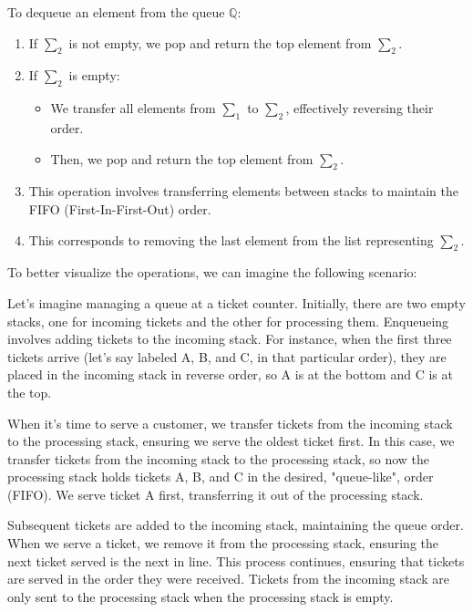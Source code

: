 \documentclass[12pt]{article}
\begin{document}
\begin{spacing}{1.5}
\begin{enumerate}
		      To dequeue an element from the queue $\mathbb{Q}$:
		      		      
		      \begin{enumerate}
		      	\item If $\sum_2$ is not empty, we pop and return the top element from $\sum_2$.
		      	\item If $\sum_2$ is empty:
		      	      \begin{itemize}
		      	      	\item We transfer all elements from $\sum_1$ to $\sum_2$, effectively reversing their order.
		      	      	\item Then, we pop and return the top element from $\sum_2$.
		      	      \end{itemize}
		      	\item This operation involves transferring elements between stacks to maintain the FIFO (First-In-First-Out) order.
		      	\item This corresponds to removing the last element from the list representing $\sum_2$.
		      \end{enumerate}
		      		      
		      To better visualize the operations, we can imagine the following scenario:
		      		      
		      Let's imagine managing a queue at a ticket counter. Initially, there are two empty stacks, one for incoming tickets and the other for processing them. Enqueueing involves adding tickets to the incoming stack. For instance, when the first three tickets arrive (let's say labeled A, B, and C, in that particular order), they are placed in the incoming stack in reverse order, so A is at the bottom and C is at the top.
		      		              
		      When it's time to serve a customer, we transfer tickets from the incoming stack to the processing stack, ensuring we serve the oldest ticket first. In this case, we transfer tickets from the incoming stack to the processing stack, so now the processing stack holds tickets A, B, and C in the desired, "queue-like", order (FIFO). We serve ticket A first, transferring it out of the processing stack.
		      		              
		      Subsequent tickets are added to the incoming stack, maintaining the queue order. When we serve a ticket, we remove it from the processing stack, ensuring the next ticket served is the next in line. This process continues, ensuring that tickets are served in the order they were received. Tickets from the incoming stack are only sent to the processing stack when the processing stack is empty.
		      		      

\end{enumerate}
\end{spacing}
\end{document}
